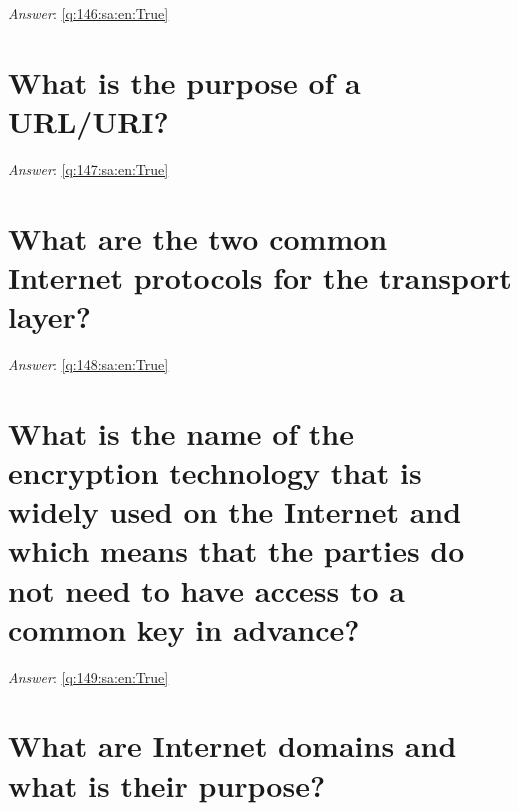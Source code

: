 \documentclass[a4paper,11pt,oneside]{book}
\begin{document}
\begin{sloppypar}
\vspace{1cm}

\textit{Answer}: \autoref{q:146:sa:en:True}



\section{What is the purpose of a URL/URI?}

\label{q:147:sa:en:False}

\vspace{2cm}

\noindent\makebox[\textwidth]{\hrulefill}

\vspace{1cm}

\textit{Answer}: \autoref{q:147:sa:en:True}



\section{What are the two common Internet protocols for the transport layer?}

\label{q:148:sa:en:False}

\vspace{2cm}

\noindent\makebox[\textwidth]{\hrulefill}

\vspace{1cm}

\textit{Answer}: \autoref{q:148:sa:en:True}



\section{What is the name of the encryption technology that is widely used on the Internet and which means that the parties do not need to have access to a common key in advance?}

\label{q:149:sa:en:False}

\vspace{2cm}

\noindent\makebox[\textwidth]{\hrulefill}

\vspace{1cm}

\textit{Answer}: \autoref{q:149:sa:en:True}



\section{What are Internet domains and what is their purpose?}


\end{sloppypar}
\end{document}
